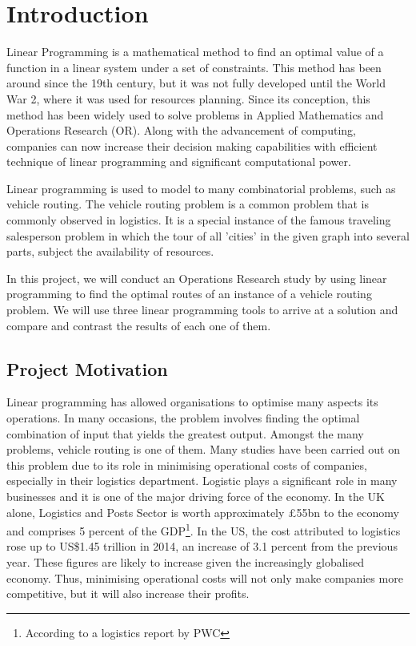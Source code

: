 \chapter{Introduction}
Linear Programming is a mathematical method to find an optimal value of a function in a linear system under a set of
constraints. This method has been around since the 19th century, but it was not fully developed until the World War 2,
where it was used for resources planning. Since its conception, this method has been widely used to solve problems
in Applied Mathematics and Operations Research (OR). Along with the advancement of computing, companies can now increase their
decision making capabilities with efficient technique of linear programming and significant computational power.

Linear programming is used to model to many combinatorial problems, such as vehicle routing.
The vehicle routing problem is a common problem that is commonly observed in logistics.
It is a special instance of the famous traveling salesperson problem in which the tour of
all 'cities' in the given graph into several parts, subject the availability of resources.

In this project, we will conduct an Operations Research study by using linear programming to find the optimal routes of an instance of a vehicle routing
problem. We will use three linear programming tools to arrive at a solution and compare and contrast the results of each one of them.

\section{Project Motivation}
Linear programming has allowed organisations to optimise many aspects its operations. In many occasions, the problem involves
finding the optimal combination of input that yields the greatest output. Amongst the many problems,
vehicle routing is one of them. Many studies have been carried out on this problem due to its role in minimising operational
costs of companies, especially in their logistics department. Logistic plays a significant role in many businesses and it is one of the major
driving force of the economy. In the UK alone, Logistics and Posts Sector is worth approximately
\pounds55bn to the economy and comprises 5 percent of the GDP\footnote{According to a logistics report by PWC }.
In the US, the cost attributed to logistics rose up to US\$1.45 trillion in 2014, an increase of 3.1 percent from the previous year.
These figures are likely to increase given the increasingly globalised economy. Thus, minimising operational costs will not only make companies
more competitive, but it will also increase their profits.

